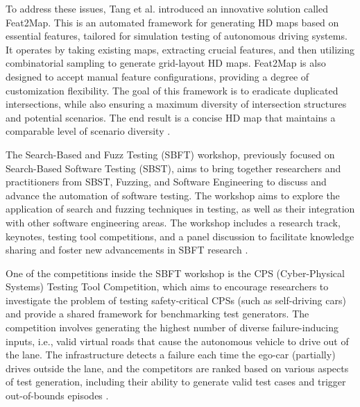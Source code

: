 To address these issues, Tang et al. introduced an innovative solution called Feat2Map. This is an automated framework for generating HD maps based on essential features, tailored for simulation testing of autonomous driving systems. It operates by taking existing maps, extracting crucial features, and then utilizing combinatorial sampling to generate grid-layout HD maps. Feat2Map is also designed to accept manual feature configurations, providing a degree of customization flexibility. The goal of this framework is to eradicate duplicated intersections, while also ensuring a maximum diversity of intersection structures and potential scenarios. The end result is a concise HD map that maintains a comparable level of scenario diversity \cite{TangZYZRLZC}.

The Search-Based and Fuzz Testing (SBFT) workshop, previously focused on Search-Based Software Testing (SBST), aims to bring together researchers and practitioners from SBST, Fuzzing, and Software Engineering to discuss and advance the automation of software testing. The workshop aims to explore the application of search and fuzzing techniques in testing, as well as their integration with other software engineering areas. The workshop includes a research track, keynotes, testing tool competitions, and a panel discussion to facilitate knowledge sharing and foster new advancements in SBFT research \cite{SBFT}.

One of the competitions inside the SBFT workshop is the CPS (Cyber-Physical Systems) Testing Tool Competition, which aims to encourage researchers to investigate the problem of testing safety-critical CPSs (such as self-driving cars) and provide a shared framework for benchmarking test generators. The competition involves generating the highest number of diverse failure-inducing inputs, i.e., valid virtual roads that cause the autonomous vehicle to drive out of the lane. The infrastructure detects a failure each time the ego-car (partially) drives outside the lane, and the competitors are ranked based on various aspects of test generation, including their ability to generate valid test cases and trigger out-of-bounds episodes \cite{GambiJRZ}.

